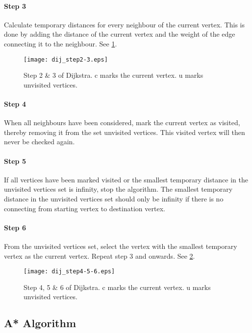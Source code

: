     \paragraph{Step 3}\label{par:dij_step3}
Calculate temporary distances for every neighbour of the current vertex. This is done by adding the distance of the current vertex and the weight of the edge connecting it to the neighbour. See \cref{fig:dij_step2-3}.

  \begin{figure}[ht!]
    \centering
    \texttt{[image: dij\_step2-3.eps]}
    \caption{Step 2 \& 3 of Dijkstra. c marks the current vertex. u marks unvisited vertices.}
    \label{fig:dij_step2-3}
  \end{figure}

      \paragraph{Step 4}
When all neighbours have been considered, mark the current vertex as visited, thereby removing it from the set unvisited vertices. This visited vertex will then never be checked again. 

\paragraph{Step 5}
If all vertices have been marked visited or the smallest temporary distance in the unvisited vertices set is infinity, stop the algorithm. The smallest temporary distance in the unvisited vertices set should only be infinity if there is no connecting from starting vertex to destination vertex.

\paragraph{Step 6}
From the unvisited vertices set, select the vertex with the smallest temporary vertex as the current vertex. Repeat step 3 and onwards. See \cref{fig:dij_step4-5-6}.

  \begin{figure}[ht!]
    \centering
    \texttt{[image: dij\_step4-5-6.eps]}
    \caption{Step 4, 5 \& 6 of Dijkstra. c marks the current vertex. u marks unvisited vertices.}
    \label{fig:dij_step4-5-6}
  \end{figure}


  \subsection{A* Algorithm}\label{subs_astar}


